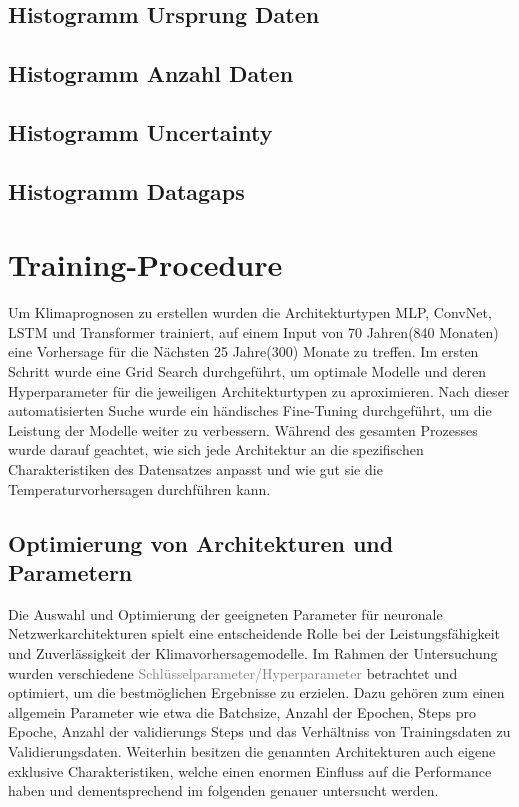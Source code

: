 \documentclass[manuscript,screen,review]{acmart} %
\begin{document}
\subsection{Histogramm Ursprung Daten}

\subsection{Histogramm Anzahl Daten}

\subsection{Histogramm Uncertainty}

\subsection{Histogramm Datagaps}


\section{Training-Procedure}

Um Klimaprognosen zu erstellen wurden die Architekturtypen MLP, ConvNet, LSTM und Transformer trainiert, auf einem Input von 70 Jahren(840 Monaten) eine Vorhersage für die Nächsten 25 Jahre(300) Monate zu treffen.
Im ersten Schritt wurde eine Grid Search durchgeführt, um optimale Modelle und deren Hyperparameter für die jeweiligen Architekturtypen zu aproximieren. 
Nach dieser automatisierten Suche wurde ein händisches Fine-Tuning durchgeführt, um die Leistung der Modelle weiter zu verbessern. 
Während des gesamten Prozesses wurde darauf geachtet, wie sich jede Architektur an die spezifischen Charakteristiken des Datensatzes anpasst und 
wie gut sie die Temperaturvorhersagen durchführen kann.

\subsection{Optimierung von Architekturen und Parametern}
Die Auswahl und Optimierung der geeigneten Parameter für neuronale Netzwerkarchitekturen spielt eine entscheidende Rolle bei der Leistungsfähigkeit und Zuverlässigkeit der Klimavorhersagemodelle. 
Im Rahmen der Untersuchung wurden verschiedene \textcolor{gray}{Schlüsselparameter/Hyperparameter} betrachtet und optimiert, um die bestmöglichen Ergebnisse zu erzielen.
Dazu gehören zum einen allgemein Parameter wie etwa die Batchsize, Anzahl der Epochen, Steps pro Epoche, Anzahl der validierungs Steps und das Verhältniss von Trainingsdaten zu Validierungsdaten.
Weiterhin besitzen die genannten Architekturen auch eigene exklusive Charakteristiken, welche einen enormen Einfluss auf die Performance haben und dementsprechend im folgenden genauer untersucht werden.
\end{document}
